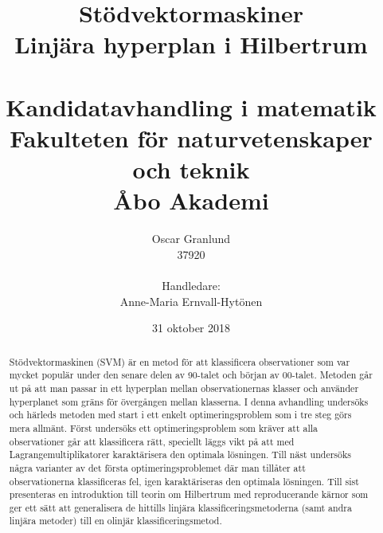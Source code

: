 \documentclass[a4paper, 12pt]{report}
\title{{\Huge Stödvektormaskiner}\\
{\Large Linjära hyperplan i Hilbertrum}\\
~\\
{\large Kandidatavhandling i matematik}\\
{\large Fakulteten för naturvetenskaper och teknik}\\
{\large Åbo Akademi}}
\author{{\Large Oscar Granlund}\\
{\Large37920}\\
\\
{\large Handledare:}\\{\large Anne-Maria Ernvall-Hytönen}}
\date{31 oktober 2018}
\theoremstyle{definition}
\theoremstyle{remark}
\newcommand{\bfx}{\mathbf{x}}
\newcommand{\bfy}{\mathbf{y}}
\begin{document}
\maketitle

\begin{abstract}
	Stödvektormaskinen (SVM) är en metod för att klassificera observationer som var mycket populär under den senare delen av 90-talet och början av 00-talet.
	Metoden går ut på att man passar in ett hyperplan mellan observationernas klasser och använder hyperplanet som gräns för övergången mellan klasserna.
	I denna avhandling undersöks och härleds metoden med start i ett enkelt optimeringsproblem som i tre steg görs mera allmänt.
	Först undersöks ett optimeringsproblem som kräver att alla observationer går att klassificera rätt, speciellt läggs vikt på att med Lagrangemultiplikatorer karaktärisera den optimala lösningen.
	Till näst undersöks några varianter av det första optimeringsproblemet där man tillåter att observationerna klassificeras fel, igen karaktäriseras den optimala lösningen.
	Till sist presenteras en introduktion till teorin om Hilbertrum med reproducerande kärnor som ger ett sätt att generalisera de hittills linjära klassificeringsmetoderna (samt andra linjära metoder) till en olinjär klassificeringsmetod.
\end{abstract}

\tableofcontents
\end{document}
